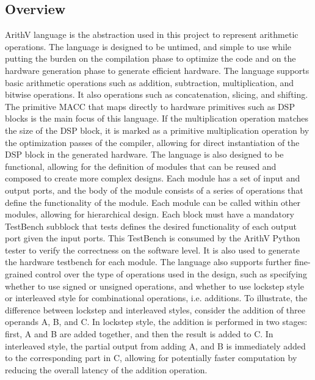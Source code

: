 \subsection{Overview}
ArithV language is the abstraction used in this project to represent arithmetic operations.
The language is designed to be untimed, and simple to use while putting the burden on the compilation phase to optimize the code and on the hardware generation phase to generate efficient hardware.
The language supports basic arithmetic operations such as addition, subtraction, multiplication, and bitwise operations.
It also operations such as concatenation, slicing, and shifting. 
The primitive MACC that maps directly to hardware primitives such as DSP blocks is the main focus of this language.
If the multiplication operation matches the size of the DSP block, it is marked as a primitive multiplication operation by the optimization passes of the compiler, allowing for direct instantiation of the DSP block in the generated hardware.
The language is also designed to be functional, allowing for the definition of modules that can be reused and composed to create more complex designs.
Each module has a set of input and output ports, and the body of the module consists of a series of operations that define the functionality of the module.
Each module can be called within other modules, allowing for hierarchical design.
Each block must have a mandatory TestBench subblock that tests defines the desired functionality of each output port given the input ports.
This TestBench is consumed by the ArithV Python tester to verify the correctness on the software level.
It is also used to generate the hardware testbench for each module. 
The language also supports further fine-grained control over the type of operations used in the design, such as specifying whether to use signed or unsigned operations, and whether to use lockstep style or interleaved style for combinational operations, i.e. additions. 
To illustrate, the difference between lockstep and interleaved styles, consider the addition of three operands A, B, and C.
In lockstep style, the addition is performed in two stages: first, A and B are added together, and then the result is added to C.
In interleaved style, the partial output from adding A, and B is immediately added to the corresponding part in C, allowing for potentially faster computation by reducing the overall latency of the addition operation.





